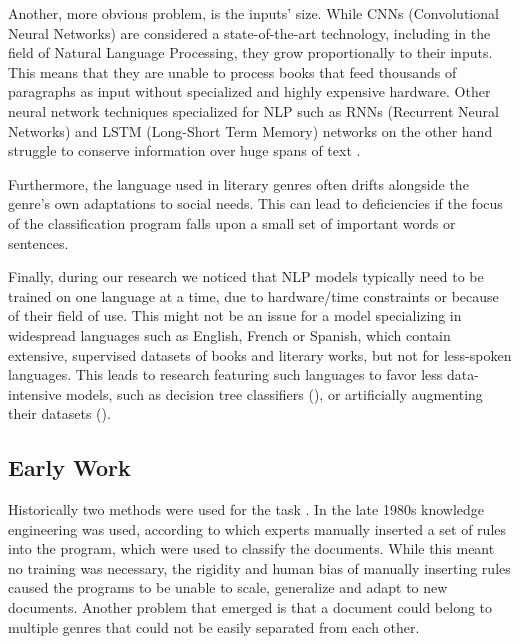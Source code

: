 \documentclass{article}
\begin{document}
	Another, more obvious problem, is the inputs' size. While CNNs (Convolutional Neural Networks) are considered a state-of-the-art technology, including in the field of Natural Language Processing, they grow proportionally to their inputs. This means that they are unable to process books that feed thousands of paragraphs as input without specialized and highly expensive hardware. Other neural network techniques specialized for NLP such as RNNs (Recurrent Neural Networks) and LSTM (Long-Short Term Memory) networks on the other hand struggle to conserve information over huge spans of text \cite{worsham_book}. \par
	
	Furthermore, the language used in literary genres often drifts alongside the genre's own adaptations to social needs. This can lead to deficiencies if the focus of the classification program falls upon a small set of important words or sentences\cite{brazil}. \par
	
	Finally, during our research we noticed that NLP models typically need to be trained on one language at a time, due to hardware/time constraints or because of their field of use. This might not be an issue for a model specializing in widespread languages such as English, French or Spanish, which contain extensive, supervised datasets of books and literary works, but not for less-spoken languages. This leads to research featuring such languages to favor less data-intensive models, such as decision tree classifiers (\cite{brazil}), or artificially augmenting their datasets (\cite{geroge}).\par
	
	\subsection{Early Work}
	
	Historically two methods were used for the task \cite{rami}. 
	In the late 1980s knowledge engineering was used, according to which experts manually inserted a set of rules into the program, which were used to classify the documents. While this meant no training was necessary, the rigidity and human bias of manually inserting rules caused the programs to be unable to scale, generalize and adapt to new documents. Another problem that emerged is that a document could belong to multiple genres that could not be easily separated from each other.\par
	
\end{document}
